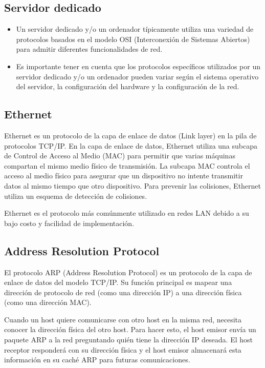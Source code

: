\subsection{Servidor dedicado}


\begin{itemize}

  \item Un servidor dedicado y/o un ordenador típicamente utiliza una variedad de protocolos basados en el modelo OSI (Interconexión de Sistemas Abiertos) para admitir diferentes funcionalidades de red. 

  \item Es importante tener en cuenta que los protocolos específicos utilizados por un servidor dedicado y/o un ordenador pueden variar según el sistema operativo del servidor, la configuración del hardware y la configuración de la red.

\end{itemize}



\subsection{Ethernet}

Ethernet es un protocolo de la capa de enlace de datos (Link layer) en la pila de protocolos TCP/IP. En la capa de enlace de datos, Ethernet utiliza una subcapa de Control de Acceso al Medio (MAC) para permitir que varias máquinas compartan el mismo medio físico de transmisión. La subcapa MAC controla el acceso al medio físico para asegurar que un dispositivo no intente transmitir datos al mismo tiempo que otro dispositivo. Para prevenir las colisiones, Ethernet utiliza un esquema de detección de colisiones.

Ethernet es el protocolo más comúnmente utilizado en redes LAN debido a su bajo costo y facilidad de implementación.


\subsection{Address Resolution Protocol}

El protocolo ARP (Address Resolution Protocol) es un protocolo de la capa de enlace de datos del modelo TCP/IP. Su función principal es mapear una dirección de protocolo de red (como una dirección IP) a una dirección física (como una dirección MAC).

Cuando un host quiere comunicarse con otro host en la misma red, necesita conocer la dirección física del otro host. Para hacer esto, el host emisor envía un paquete ARP a la red preguntando quién tiene la dirección IP deseada. El host receptor responderá con su dirección física y el host emisor almacenará esta información en su caché ARP para futuras comunicaciones.

